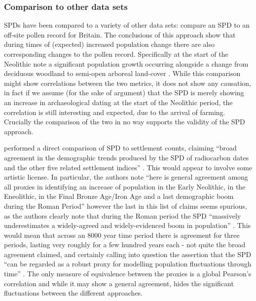 \subsubsection{Comparison to other data sets}
SPDs have been compared to a variety of other data sets: \citet{WOODBRIDGE2014216} compare an SPD to an off-site pollen record for Britain. The conclusions of this approach show that during times of (expected) increased population change there are also corresponding changes to the pollen record. Specifically at the start of the Neolithic \citet{WOODBRIDGE2014216} note a significant population growth occurring alongside a change from deciduous woodland to semi-open arboreal land-cover \citep[219]{WOODBRIDGE2014216}. While this comparison might show correlations between the two metrics, it does not show any causation, in fact if we assume (for the sake of argument) that the SPD is merely showing an increase in archaeological dating at the start of the Neolithic period, the correlation is still interesting and expected, due to the arrival of farming. Crucially the comparison of the two in no way supports the validity of the SPD approach.

\citet{PALMISANO201759} performed a direct comparison of SPD to settlement counts, claiming ``broad agreement in the demographic trends produced by the SPD of radiocarbon dates and the other five related settlement indices'' \citep[68]{PALMISANO201759}. This would appear to involve some artistic license. In particular, the authors note ``here is general agreement among all proxies in identifying an increase of population in the Early Neolithic, in the Eneolithic, in the Final Bronze Age/Iron Age and a last demographic boom during the Roman Period'' \citep[70]{PALMISANO201759} however the last in this list of claims seems spurious, as the authors clearly note that during the Roman period the SPD ``massively underestimates a widely-agreed and widely-evidenced boom in population'' \citep[66]{PALMISANO201759}. This would mean that across an 8000 year time period there is agreement for three periods, lasting very roughly for a few hundred years each - not quite the broad agreement claimed, and certainly calling into question the assertion that the SPD ``can be regarded as a robust proxy for modelling population fluctuations through time'' \citep[68]{PALMISANO201759}. The only measure of equivalence between the proxies is a global Pearson's correlation and while it may show a general agreement, hides the significant fluctuations between the different approaches. 

